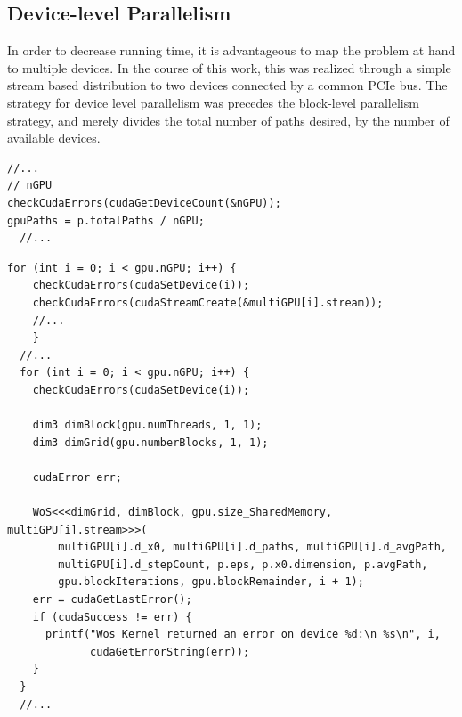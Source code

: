 \subsection{Device-level Parallelism} \label{devicePar}
In order to decrease running time, it is advantageous to map the problem at hand
to multiple devices.  In the course of this work, this was realized through a
simple stream based distribution to two devices connected by a common PCIe bus.
The strategy for device level parallelism was precedes the block-level parallelism
strategy, and merely divides the total number of paths desired, by the number of
available devices.
\begin{lstlisting}[caption="src/gpu\_config.cpp Appendix \ref{appendix}",label=device-parallelism-strategy1]
  //...
// nGPU
checkCudaErrors(cudaGetDeviceCount(&nGPU));
gpuPaths = p.totalPaths / nGPU;
  //...
\end{lstlisting}

\begin{lstlisting}[caption="src/wos\_native.cuh Appendix \ref{appendix}",label=device-parallelism-strategy2]
  for (int i = 0; i < gpu.nGPU; i++) {
    checkCudaErrors(cudaSetDevice(i));
    checkCudaErrors(cudaStreamCreate(&multiGPU[i].stream));
    //...
    }
  //...
  for (int i = 0; i < gpu.nGPU; i++) {
    checkCudaErrors(cudaSetDevice(i));

    dim3 dimBlock(gpu.numThreads, 1, 1);
    dim3 dimGrid(gpu.numberBlocks, 1, 1);

    cudaError err;

    WoS<<<dimGrid, dimBlock, gpu.size_SharedMemory, multiGPU[i].stream>>>(
        multiGPU[i].d_x0, multiGPU[i].d_paths, multiGPU[i].d_avgPath,
        multiGPU[i].d_stepCount, p.eps, p.x0.dimension, p.avgPath,
        gpu.blockIterations, gpu.blockRemainder, i + 1);
    err = cudaGetLastError();
    if (cudaSuccess != err) {
      printf("Wos Kernel returned an error on device %d:\n %s\n", i,
             cudaGetErrorString(err));
    }
  }
  //...
\end{lstlisting}



